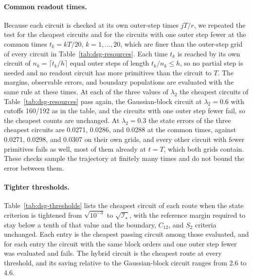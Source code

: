 \documentclass[pra,twocolumn,superscriptaddress,nofootinbib,floatfix]{revtex4-2}
\theoremstyle{remark}
\begin{document}
\paragraph{Common readout times.}
Because each circuit is checked at its own outer-step times \(jT/r\), we repeated the test for the cheapest circuits and for the circuits with one outer step fewer at the common times \(t_k=kT/20\), \(k=1,\ldots,20\), which are finer than the outer-step grid of every circuit in Table~\ref{tab:dsg-resources}. Each time \(t_k\) is reached by its own circuit of \(n_k=\lceil t_k/h\rceil\) equal outer steps of length \(t_k/n_k\le h\), so no partial step is needed and no readout circuit has more primitives than the circuit to \(T\). The margins, observable errors, and boundary populations are evaluated with the same rule at these times. At each of the three values of \(\lambda_2\) the cheapest circuits of Table~\ref{tab:dsg-resources} pass again, the Gaussian-block circuit at \(\lambda_2=0.6\) with cutoffs 160/192 as in the table, and the circuits with one outer step fewer fail, so the cheapest counts are unchanged. At \(\lambda_2=0.3\) the state errors of the three cheapest circuits are 0.0271, 0.0286, and 0.0288 at the common times, against 0.0271, 0.0298, and 0.0307 on their own grids, and every other circuit with fewer primitives fails as well, most of them already at \(t=T\), which both grids contain. These checks sample the trajectory at finitely many times and do not bound the error between them.

\paragraph{Tighter thresholds.}
Table~\ref{tab:dsg-thresholds} lists the cheapest circuit of each route when the state criterion is tightened from \(\sqrt{10^{-3}}\) to \(\sqrt{\mathcal I_\star}\), with the reference margin required to stay below a tenth of that value and the boundary, \(C_{12}\), and \(S_2\) criteria unchanged. Each entry is the cheapest passing circuit among those evaluated, and for each entry the circuit with the same block orders and one outer step fewer was evaluated and fails. The hybrid circuit is the cheapest route at every threshold, and its saving relative to the Gaussian-block circuit ranges from 2.6 to 4.6.
\end{document}
